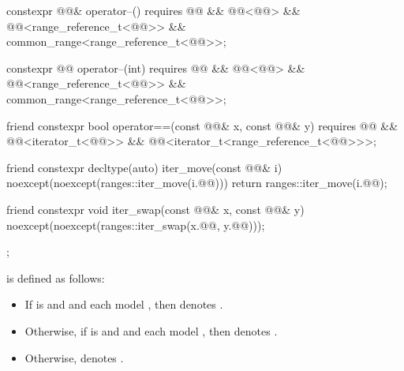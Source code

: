 \begin{codeblock}
{{    constexpr @@& operator--()
      requires @@ && @@<@@> &&
               @@<range_reference_t<@@>> &&
               common_range<range_reference_t<@@>>;

    constexpr @@ operator--(int)
      requires @@ && @@<@@> &&
               @@<range_reference_t<@@>> &&
               common_range<range_reference_t<@@>>;

    friend constexpr bool operator==(const @@& x, const @@& y)
      requires @@ && @@<iterator_t<@@>> &&
               @@<iterator_t<range_reference_t<@@>>>;

    friend constexpr decltype(auto) iter_move(const @@& i)
    noexcept(noexcept(ranges::iter_move(i.@@))) {
      return ranges::iter_move(i.@@);
    }

    friend constexpr void iter_swap(const @@& x, const @@& y)
      noexcept(noexcept(ranges::iter_swap(x.@@, y.@@)));
  };
}
\end{codeblock}

\pnum
{} is defined as follows:
\begin{itemize}
\item If  is  and
   and  each model
  , then  denotes
  .
\item Otherwise, if  is  and
   and 
  each model , then  denotes
  .
\item Otherwise,  denotes .
\end{itemize}

